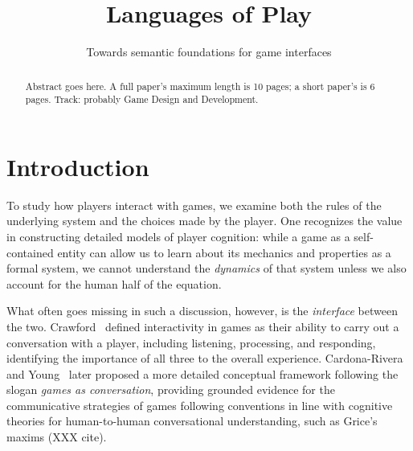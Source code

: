 \documentclass[sigconf]{acmart}
\begin{document}
\title{Languages of Play}
\subtitle{Towards semantic foundations for game interfaces}


% 


\begin{abstract}
Abstract goes here. A full paper's maximum length is 10 pages; a short
paper's is 6 pages. Track: probably Game Design and Development.
\end{abstract}



\maketitle

\section{Introduction}

To study how players interact with games, we examine both the rules of the
underlying system and the choices made by the player. One recognizes the
value in constructing detailed models of player cognition: while a game as
a self-contained entity can allow us to learn about its mechanics and
properties as a formal system, we cannot understand the {\em dynamics} of
that system unless we also account for the human half of the equation.


What often goes missing in such a discussion, however, is the {\em
interface} between the two. Crawford~\cite{crawford2003chris} defined
interactivity in games as their ability to carry out a conversation with a
player, including listening, processing, and responding, identifying the
importance of all three to the overall experience. Cardona-Rivera and
Young~\cite{cardona2014games} later proposed a more detailed conceptual
framework following the slogan {\em games as conversation}, providing
grounded evidence for the communicative strategies of games following
conventions in line with cognitive theories for human-to-human
conversational understanding, such as Grice's maxims (XXX cite).
\end{document}
